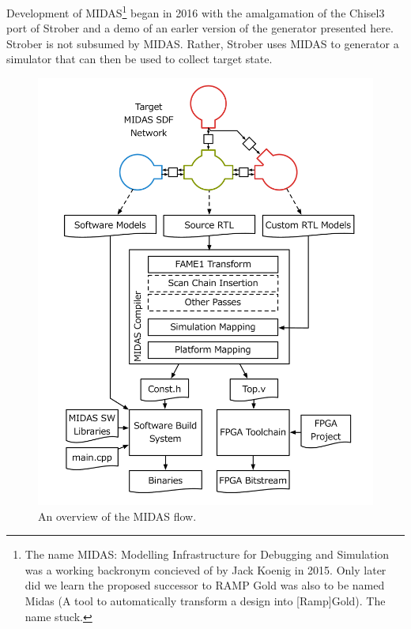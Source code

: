 Development of MIDAS\footnote{The name MIDAS: Modelling Infrastructure for
Debugging and Simulation was a working backronym concieved of by Jack Koenig in
2015. Only later did we learn the proposed successor to RAMP Gold was also to
be named Midas (A tool to automatically transform a design into [Ramp]Gold).
The name stuck.} began in 2016 with the amalgamation of the Chisel3 port of
Strober and a demo of an earler version of the generator presented here.
Strober is not subsumed by MIDAS.  Rather, Strober uses MIDAS to generator a
simulator that can then be used to collect target state.

\begin{figure}
	\centering
	\includegraphics[width=16cm]{figures/toolchain.pdf}
    \caption{An overview of the MIDAS flow.}
	\label{fig:midas}
\end{figure}

